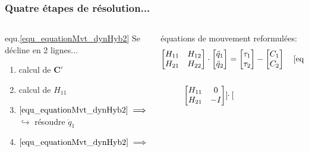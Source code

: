 \documentclass[10pt]{beamer}
\begin{document}
\begin{frame}\small

  \frametitle{Quatre étapes de résolution...}
  
  \begin{columns}[T]
  \begin{column}{.6\textwidth}
    equ.\eqref{equ_equationMvt_dynHyb2} Se décline en 2 lignes... \bigskip \\
    \begin{enumerate}
    \item <3-> calcul de $\boldsymbol{C'}$
    \item <3-> calcul de $H_{11}$
    \item <1-> ${\eqref{equ_equationMvt_dynHyb2} \implies H_{11} \boldsymbol{\ddot{q}_1 = \tau_1 - C'_1}}$ \\
    $\hookrightarrow$ résoudre $\ddot{q}_1$
    \item <2-> $\eqref{equ_equationMvt_dynHyb2} \implies \boldsymbol{\tau_2 = C'_2} + H_{21} \boldsymbol{\ddot{q}_1}$
    \end{enumerate}
  \end{column}
  \begin{column}{.37\textwidth}
  	\begin{block}{\footnotesize{équations de mouvement reformulées:}}\tiny
	  \begin{align*}
	  	\begin{bmatrix}
		  H_{11} & H_{12} \\
		  H_{21} & H_{22}
		\end{bmatrix} 
		\cdot
		\begin{bmatrix}
		  \ddot{q}_{1} \\
		  \ddot{q}_{2}
		\end{bmatrix} 
		&= 
		\begin{bmatrix}
		  \tau_{1} \\
		  \tau_{2}
		\end{bmatrix} 
		-
		\begin{bmatrix}
		  C_{1} \\
		  C_{2}
		\end{bmatrix} \quad \eqref{equ_local_eqMvt_2} \\
		\notag \\
		\begin{bmatrix}
		  H_{11} & 0 \\
		  H_{21} &  -I
		\end{bmatrix} 
		\cdot
		\begin{bmatrix}

\end{bmatrix}
\end{align*}
\end{block}
\end{column}
\end{columns}
\end{frame}
\end{document}
